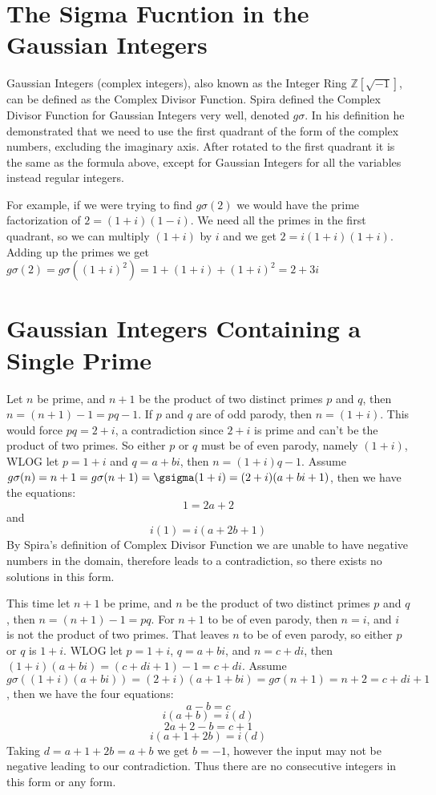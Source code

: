 \documentclass[12pt]{amsart}
\begin{document}
\section{The Sigma Fucntion in the Gaussian Integers}
Gaussian Integers (complex integers), also known as the Integer Ring $\mathds{Z}[\sqrt{-1}]$, can be defined as the Complex Divisor Function. Spira defined the Complex Divisor Function for Gaussian Integers very well, denoted $g\sigma$. In his definition he demonstrated that we need to use the first quadrant of the form of the complex numbers, excluding the imaginary axis. After rotated to the first quadrant it is the same as the formula above, except for Gaussian Integers for all the variables instead regular integers.

For example, if we were trying to find $g\sigma(2)$ we would have the prime factorization of $2 = (1+i)(1-i)$. We need all the primes in the first quadrant, so we can multiply $(1+i)$ by $i$ and we get $2 = i(1+i)(1+i)$. Adding up the primes we get $g\sigma(2) = g\sigma((1+i)^2) = 1 + (1+i) + (1+i)^2 = 2 + 3i$

\section{Gaussian Integers Containing a Single Prime}
Let $n$ be prime, and $n+1$ be the product of two distinct primes $p$ and $q$, then $n = (n + 1) - 1 = pq - 1$. If $p$ and $q$ are of odd parody, then $n = (1+i)$. This would force $pq = 2+i$, a contradiction since $2+i$ is prime and can't be the product of two primes. So either $p$ or $q$ must be of even parody, namely $(1+i)$, WLOG let $p = 1 + i$ and $q=a + bi$, then $n = (1+i)q - 1$. Assume $g\sigma(n) = n+1 = g\sigma(n+1) = \gsigma(1+i) = (2+i)(a + bi +1)$, then we have the equations: $$1 = 2a + 2$$ and $$i(1) = i(a + 2b + 1)$$ By Spira's definition of Complex Divisor Function we are unable to have negative numbers in the domain, therefore leads to a contradiction, so there exists no solutions in this form.

This time let $n+1$ be prime, and $n$ be the product of two distinct primes $p$ and $q$, then $n = (n+1) -1 = pq$. For $n+1$ to be of even parody, then $n = i$, and $i$ is not the product of two primes. That leaves $n$ to be of even parody, so either $p$ or $q$ is $1+i$. WLOG let $p=1+i$, $q=a+bi$, and $n = c + di$, then $(1+i)(a+bi) = (c + di+1) - 1 = c + di$. Assume $g\sigma((1+i)(a+bi)) = (2+i)(a+1+bi) = g\sigma(n+1) = n + 2 = c + di + 1$, then we have the four equations:
$$a -b = c$$ $$i(a + b) = i(d)$$ $$2a + 2 -b = c + 1$$ $$i(a + 1 + 2b) = i(d)$$ Taking $d = a + 1 + 2b = a + b$ we get $b = -1$, however the input may not be negative leading to our contradiction. Thus there are no consecutive integers in this form or any form.
\\
\end{document}
